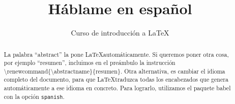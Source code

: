 \documentclass[10pt,letterpaper]{article}
\title{Háblame en español}
\author{Curso de introducción a LaTeX}
\begin{document}
\maketitle
\begin{abstract}
La palabra ``abstract'' la pone \LaTeX automáticamente. Si queremos poner otra cosa, por ejemplo ``resumen'', incluimos en el preámbulo la instrucción \textbackslash renewcommand\{\textbackslash abstractname\}\{resumen\}. Otra alternativa, es cambiar el idioma completo del documento, para que \LaTeX traduzca todas los encabezados que genera automáticamente a ese idioma en concreto. Para lograrlo, utilizamos el paquete babel con la opción \texttt{spanish}.
\end{abstract}
\end{document}
